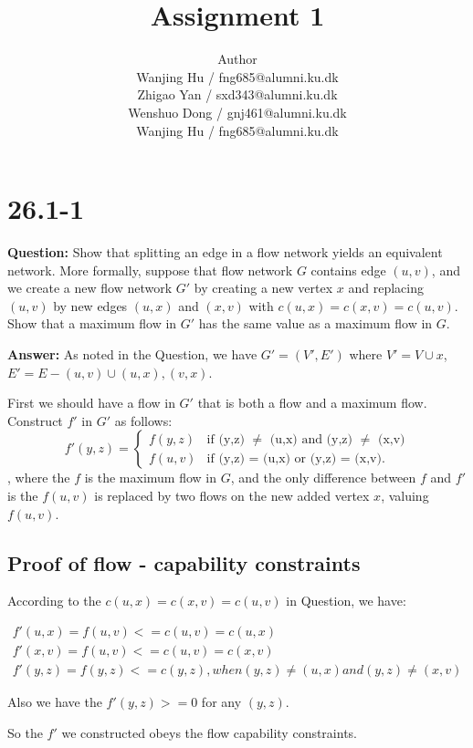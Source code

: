 \documentclass[12pt]{article}
\title{Assignment 1}
\author{Author \\
  Wanjing Hu / fng685@alumni.ku.dk  \\
  Zhigao Yan / sxd343@alumni.ku.dk  \\
  Wenshuo Dong / gnj461@alumni.ku.dk  \\
  Wanjing Hu / fng685@alumni.ku.dk  \\
}
\begin{document}
\maketitle


\section{26.1-1}
\textbf{Question: }Show that splitting an edge in a flow network yields an equivalent network. More formally, suppose that flow network $G$ contains edge $(u, v)$, and we create a new flow network $G'$ by creating a new vertex $x$ and replacing $(u, v)$ by new edges $(u, x)$ and $(x, v)$ with $c(u, x) = c(x, v) = c(u, v)$. Show that a maximum flow in $G'$ has the same value as a maximum flow in $G$.

\textbf{Answer: }As noted in the Question, we have $G'=(V',E')$ where $V'=V\cup{x}$, $E'=E-{(u,v)}\cup{(u,x), (v, x)}$.

First we should have a flow in $G'$ that is both a flow and a maximum flow. Construct $f'$ in $G'$ as follows:
\begin{equation}
f'(y,z) = 
\begin{cases}
f(y,z) &\mbox{if (y,z) $\neq$ (u,x) and (y,z) $\neq$ (x,v)}\\
f(u,v) &\mbox{if (y,z) = (u,x) or (y,z) = (x,v)}.
\end{cases}
\end{equation}
, where the $f$ is the maximum flow in $G$, and the only difference between $f$ and $f'$ is the $f(u,v)$ is replaced by two flows on the new added vertex $x$, valuing $f(u,v)$.

\subsection{Proof of flow - capability constraints}

According to the $c(u, x) = c(x, v) = c(u, v)$ in Question, we have:

\begin{gather}
f'(u,x) = f(u,v) <= c(u,v) = c(u,x)\\ \nonumber
f'(x,v) = f(u,v)<=c(u,v) = c(x,v)\\ \nonumber
f'(y,z) = f(y,z) <= c(y,z), when (y,z) \neq (u,x) and (y,z) \neq (x,v) \nonumber
\end{gather}

Also we have the $f'(y,z)>= 0$ for any $(y,z)$.

So the $f'$ we constructed obeys the flow capability constraints.
\end{document}
